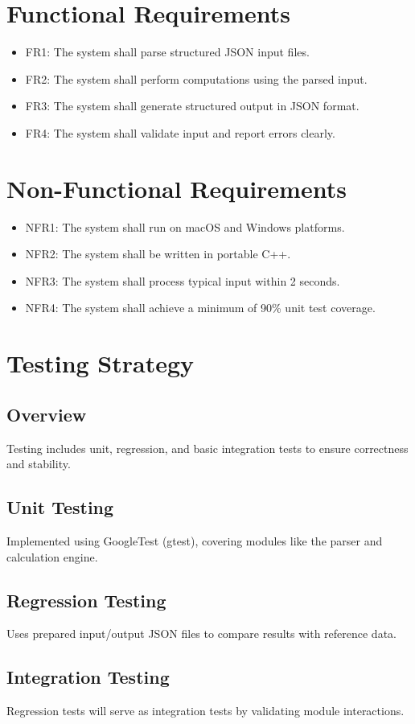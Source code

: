 \documentclass{article}
\begin{document}
\section{Functional Requirements}
\begin{itemize}
  \item FR1: The system shall parse structured JSON input files.
  \item FR2: The system shall perform computations using the parsed input.
  \item FR3: The system shall generate structured output in JSON format.
  \item FR4: The system shall validate input and report errors clearly.
\end{itemize}

\section{Non-Functional Requirements}
\begin{itemize}
  \item NFR1: The system shall run on macOS and Windows platforms.
  \item NFR2: The system shall be written in portable C++.
  \item NFR3: The system shall process typical input within 2 seconds.
  \item NFR4: The system shall achieve a minimum of 90\% unit test coverage.
\end{itemize}

\section{Testing Strategy}
\subsection{Overview}
Testing includes unit, regression, and basic integration tests to ensure correctness and stability.

\subsection{Unit Testing}
Implemented using GoogleTest (gtest), covering modules like the parser and calculation engine.

\subsection{Regression Testing}
Uses prepared input/output JSON files to compare results with reference data.

\subsection{Integration Testing}
Regression tests will serve as integration tests by validating module interactions.
\end{document}
